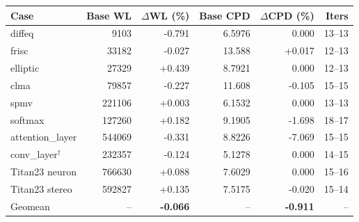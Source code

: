 \begin{tabular}{lrrrrr}
\toprule
Case & Base WL & $\Delta$WL (\%) & Base CPD & $\Delta$CPD (\%) & Iters \\
\midrule
diffeq & 9103 & -0.791 & 6.5976 & 0.000 & 13--13 \\
frisc & 33182 & -0.027 & 13.588 & +0.017 & 12--13 \\
elliptic & 27329 & +0.439 & 8.7921 & 0.000 & 12--13 \\
clma & 79857 & -0.227 & 11.608 & -0.105 & 15--15 \\
spmv & 221106 & +0.003 & 6.1532 & 0.000 & 13--13 \\
softmax & 127260 & +0.182 & 9.1905 & -1.698 & 18--17 \\
attention\_layer & 544069 & -0.331 & 8.8226 & -7.069 & 15--15 \\
conv\_layer$^{\dagger}$ & 232357 & -0.124 & 5.1278 & 0.000 & 14--15 \\
Titan23 neuron & 766630 & +0.088 & 7.6029 & 0.000 & 15--16 \\
Titan23 stereo & 592827 & +0.135 & 7.5175 & -0.020 & 15--14 \\
\midrule
Geomean & -- & \textbf{-0.066} & -- & \textbf{-0.911} & -- \\
\bottomrule
\end{tabular}
